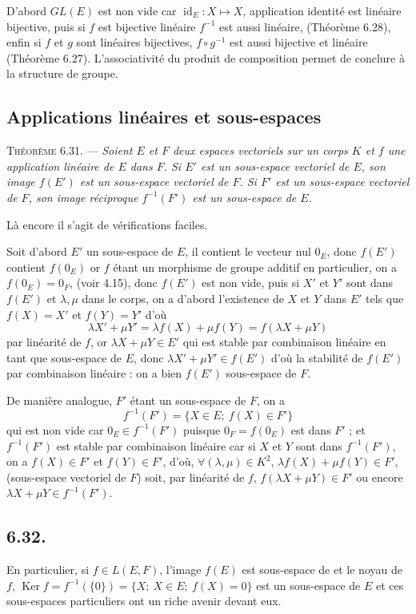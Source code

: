 D'abord $GL(E)$ est non vide car $\operatorname{id}_E:X\longmapsto X$, application identité est linéaire bijective, puis si $f$ est bijective linéaire $f^{-1}$ est aussi linéaire, (Théorème 6.28), enfin si $f$ et $g$ sont linéaires bijectives, $f\circ g^{-1}$ est aussi bijective et linéaire (Théorème 6.27). L'associativité du produit de composition permet de conclure à la structure de groupe. \bookend

\subsection*{Applications linéaires et sous-espaces}

\medskip\noindent\textsc{Théorème 6.31.} --- \emph{Soient $E$ et $F$ deux espaces vectoriels sur un corps $K$ et $f$ une application linéaire de $E$ dans $F$. Si $E'$ est un sous-espace vectoriel de $E$, son image $f(E')$ est un sous-espace vectoriel de $F$. Si $F'$ est un sous-espace vectoriel de $F$, son image réciproque $f^{-1}(F')$ est un sous-espace de $E$.}

Là encore il s'agit de vérifications faciles.

Soit d'abord $E'$ un sous-espace de $E$, il contient le vecteur nul $0_E$, donc $f(E')$ contient $f(0_E)$ or $f$ étant un morphisme de groupe additif en particulier, on a $f(0_E)=0_F$, (voir 4.15), donc $f(E')$ est non vide, puis si $X'$ et $Y'$ sont dans $f(E')$ et $\lambda,\mu$ dans le corps, on a d'abord l'existence de $X$ et $Y$ dans $E'$ tels que $f(X)=X'$ et $f(Y)=Y'$ d'où
\[
\lambda X'+\mu Y'=\lambda f(X)+\mu f(Y)=f(\lambda X+\mu Y)
\]
par linéarité de $f$, or $\lambda X+\mu Y\in E'$ qui est stable par combinaison linéaire en tant que sous-espace de $E$, donc $\lambda X'+\mu Y'\in f(E')$ d'où la stabilité de $f(E')$ par combinaison linéaire : on a bien $f(E')$ sous-espace de $F$.

De manière analogue, $F'$ étant un sous-espace de $F$, on a
\[
f^{-1}(F')=\{X\in E;\ f(X)\in F'\}
\]
qui est non vide car $0_E\in f^{-1}(F')$ puisque $0_F=f(0_E)$ est dans $F'$ ; et $f^{-1}(F')$ est stable par combinaison linéaire car si $X$ et $Y$ sont dans $f^{-1}(F')$, on a $f(X)\in F'$ et $f(Y)\in F'$, d'où, $\forall(\lambda,\mu)\in K^2$, $\lambda f(X)+\mu f(Y)\in F'$, (sous-espace vectoriel de $F$) soit, par linéarité de $f$, $f(\lambda X+\mu Y)\in F'$ ou encore $\lambda X+\mu Y\in f^{-1}(F')$. \bookend

\subsection*{6.32.}
En particulier, si $f\in L(E,F)$, l'image $f(E)$ est sous-espace de  et le noyau de $f$, $\operatorname{Ker}f=f^{-1}(\{0\})=\{X;\ X\in E;\ f(X)=0\}$ est un sous-espace de $E$ et ces sous-espaces particuliers ont un riche avenir devant eux.

